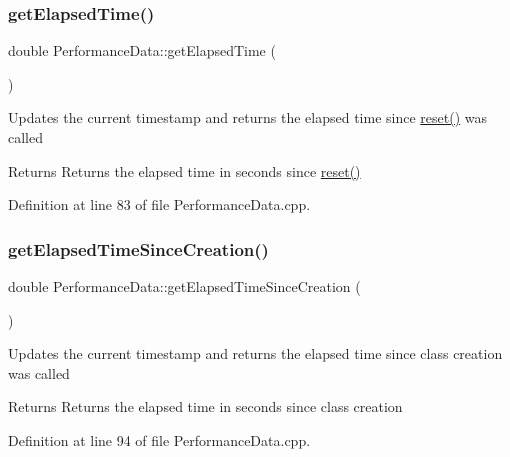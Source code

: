 \subsubsection{\texorpdfstring{get\+Elapsed\+Time()}{getElapsedTime()}}
{\footnotesize\ttfamily double Performance\+Data\+::get\+Elapsed\+Time (\begin{DoxyParamCaption}{ }\end{DoxyParamCaption})}

Updates the current timestamp and returns the elapsed time since \hyperlink{class_performance_data_a5a19e35de26351c6983f069d25ec5a95}{reset()} was called \begin{DoxyReturn}{Returns}
Returns the elapsed time in seconds since \hyperlink{class_performance_data_a5a19e35de26351c6983f069d25ec5a95}{reset()} 
\end{DoxyReturn}


Definition at line 83 of file Performance\+Data.\+cpp.

\mbox{\label{class_performance_data_a803d0b8ed600dff6100c8c486c599527}} 
\subsubsection{\texorpdfstring{get\+Elapsed\+Time\+Since\+Creation()}{getElapsedTimeSinceCreation()}}
{\footnotesize\ttfamily double Performance\+Data\+::get\+Elapsed\+Time\+Since\+Creation (\begin{DoxyParamCaption}{ }\end{DoxyParamCaption})}

Updates the current timestamp and returns the elapsed time since class creation was called \begin{DoxyReturn}{Returns}
Returns the elapsed time in seconds since class creation 
\end{DoxyReturn}


Definition at line 94 of file Performance\+Data.\+cpp.

\mbox{\label{class_performance_data_aa30d1d2ea4889a3cacc726e4487c7b78}} 

